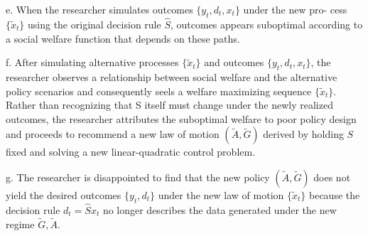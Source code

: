 \medskip

\item{e.} When the researcher simulates outcomes $\{y_t, d_t, x_t\}$ under the new pro-
cess  $\{\tilde x_t\}$  using the original decision rule $\hat S$, outcomes  appears suboptimal according to a social welfare function that depends
on these  paths.

\medskip

\item{f.}  After simulating   alternative processes 
$\{\tilde x_t\}$ and  outcomes
$\{y_t,d_t,x_t\}$, the researcher observes a relationship between social welfare
and the alternative policy scenarios and  consequently seels a  welfare
maximizing sequence $\{\tilde x_t\}$. Rather than recognizing that S itself
must change under the newly realized outcomes, the researcher attributes the suboptimal welfare to poor policy design and proceeds to
recommend  a new law of motion $(\tilde A,\tilde G)$ derived  by  holding $S$ fixed and solving a new linear-quadratic
control problem.

\medskip
\item{g.} The researcher is disappointed to find that the new policy $(\tilde A, \tilde G)$ does not yield the desired outcomes $\{y_t, d_t\}$ under the new law of motion $\{\tilde x_t\}$ because the decision rule $d_t = \hat S x_t$  no longer describes the data generated under the new regime $\tilde G, \tilde A$.






